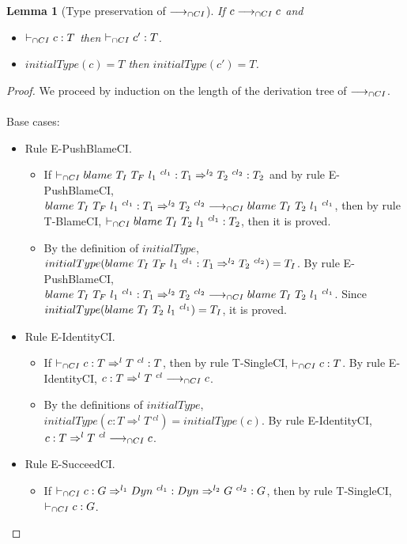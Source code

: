 \documentclass[a4paper]{article}
\newtheorem{lemma}{Lemma}[section]
\begin{document}
\begin{lemma}[Type preservation of $\longrightarrow_{\cap CI}$]
\label{type_preservationIC}
If $c \longrightarrow_{\cap CI} c$ and
\begin{itemize}
    \item $\vdash_{\cap CI} c : T$ then $\vdash_{\cap CI} c' : T$.
    \item $initialType(c) = T$ then $initialType(c') = T$.
\end{itemize}
\end{lemma}
\begin{proof}
We proceed by induction on the length of the derivation tree of $\longrightarrow_{\cap CI}$.\\\\
Base cases:
\begin{itemize}
    \item Rule E-PushBlameCI.
    \begin{itemize}
        \item If $\vdash_{\cap CI} blame\ T_I\ T_F\ l_1\ ^{cl_1} : T_1 \Rightarrow^{l_2} T_2\ ^{cl_2} : T_2$ and by rule E-PushBlameCI, $blame\ T_I\ T_F\ l_1\ ^{cl_1} : T_1 \Rightarrow^{l_2} T_2\ ^{cl_2} \longrightarrow_{\cap CI} blame\ T_I\ T_2\ l_1\ ^{cl_1}$, then by rule T-BlameCI, $\vdash_{\cap CI} blame\ T_I\ T_2\ l_1\ ^{cl_1} : T_2$, then it is proved.
        \item By the definition of $initialType$, $initialType(blame\ T_I\ T_F\ l_1\ ^{cl_1} : T_1 \Rightarrow^{l_2} T_2\ ^{cl_2}) = T_I$.
        By rule E-PushBlameCI, $blame\ T_I\ T_F\ l_1\ ^{cl_1} : T_1 \Rightarrow^{l_2} T_2\ ^{cl_2} \longrightarrow_{\cap CI} blame\ T_I\ T_2\ l_1\ ^{cl_1}$.
        Since $initialType(blame\ T_I\ T_2\ l_1\ ^{cl_1}) = T_I$, it is proved.
    \end{itemize}
    \item Rule E-IdentityCI.
    \begin{itemize}
        \item If $\vdash_{\cap CI} c : T \Rightarrow^l T\ ^{cl} : T$, then by rule T-SingleCI, $\vdash_{\cap CI} c : T$.
        By rule E-IdentityCI, $c : T \Rightarrow^l T\ ^{cl} \cios c$.
        \item By the definitions of $initialType$, $initialType(c : T \Rightarrow^l T\ ^{cl}) = initialType(c)$.
        By rule E-IdentityCI, $c : T \Rightarrow^l T\ ^{cl} \cios c$.
    \end{itemize}
    \item Rule E-SucceedCI.
    \begin{itemize}
        \item If $\cits c : G \Rightarrow^{l_1} \Dyn\ ^{cl_1} : \Dyn \Rightarrow^{l_2} G\ ^{cl_2} : G$, then by rule T-SingleCI, $\vdash_{\cap CI} c : G$.

\end{itemize}
\end{itemize}
\end{proof}
\end{document}
